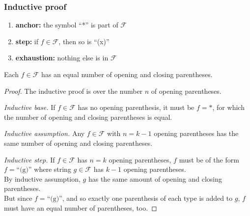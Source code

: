 \documentclass[fleqn,10pt,serif,xcolor=svgnames,xcolor=table,aspectratio=169,handout]{beamer}
\begin{document}
\begin{frame}
  \frametitle{Inductive proof}

  \begin{minipage}{0.45\linewidth}
    \begin{mfdefinition}
      \begin{enumerate}
        \item \textbf{anchor:} the symbol ``*'' is part of $\mathcal{F}$
        \item \textbf{step:} if $f \in \mathcal{F}$, then so is ``(x)''
        \item \textbf{exhaustion:} nothing else is in $\mathcal{F}$
      \end{enumerate}
    \end{mfdefinition}
  \end{minipage}
  \hfill
  \pause
  \begin{minipage}{0.45\linewidth}
    \begin{mfproposition}
      Each $f \in \mathcal{F}$ has an equal number of opening and closing parentheses.
    \end{mfproposition}
  \end{minipage}

\pause

  \begin{proof}
    The inductive proof is over the number $n$ of opening parentheses.

    \emph{Inductive base.}
    If $f \in \mathcal{F}$ has no opening parenthesis, it must be $f = *$, for which the number of opening and closing parentheses is equal.\\ \pause

    \emph{Inductive assumption.} Any $f \in \mathcal{F}$ with $n = k-1$ opening parentheses has the same number of opening and closing parentheses. \\ \pause

    \emph{Inductive step.}
    If $f \in \mathcal{F}$ has $n=k$ opening parentheses, $f$ must be of the form $f = \text{``(g)''}$ where string $g \in \mathcal{F}$ has $k-1$ opening parentheses. \\ \pause
    By inductive assumption, $g$ has the same amount of opening and closing parentheses. \\ \pause
    But since $f = \text{``(g)''}$, and so exactly one parenthesis of each type is added to $g$, $f$ must have an equal number of parentheses, too.
  \end{proof}

\end{frame}
\end{document}
